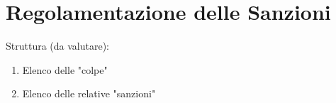 \section{Regolamentazione delle Sanzioni}

Struttura (da valutare):
\begin{enumerate}
	\item Elenco delle "colpe"
	\item Elenco delle relative "sanzioni"
\end{enumerate}